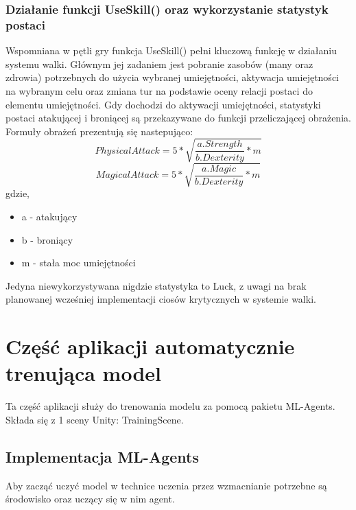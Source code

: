 \documentclass{SGGW-thesis}
\begin{document}
\subsubsection{Działanie funkcji UseSkill() oraz wykorzystanie statystyk postaci}
Wspomniana w pętli gry funkcja UseSkill() pełni kluczową funkcję w działaniu systemu walki. Głównym jej zadaniem jest pobranie zasobów (many oraz zdrowia) potrzebnych do użycia wybranej umiejętności, 
aktywacja umiejętności na wybranym celu oraz zmiana tur na podstawie oceny relacji postaci do elementu umiejętności. Gdy dochodzi do aktywacji umiejętności, statystyki postaci atakującej i broniącej są przekazywane do funkcji przeliczającej obrażenia. 
Formuły obrażeń prezentują się nastepująco:
\[PhysicalAttack = 5*\sqrt{\frac{a.Strength}{b.Dexterity}*m}\]\[MagicalAttack = 5*\sqrt{\frac{a.Magic}{b.Dexterity}*m}\]
gdzie,
\begin{itemize}
  \item{a - atakujący}
  \item{b - broniący}
  \item{m - stała moc umiejętności}
\end{itemize}
Jedyna niewykorzystywana nigdzie statystyka to Luck, z uwagi na brak planowanej wcześniej implementacji ciosów krytycznych w systemie walki.


\section{Część aplikacji automatycznie trenująca model}
Ta część aplikacji służy do trenowania modelu za pomocą pakietu ML-Agents. Składa się z 1 sceny Unity: TrainingScene.

\subsection{Implementacja ML-Agents}
Aby zacząć uczyć model w technice uczenia przez wzmacnianie potrzebne są środowisko oraz uczący się w nim agent.
\end{document}
